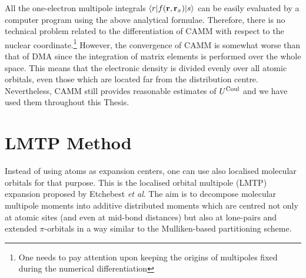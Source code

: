 \documentclass[a4paper,titlepage,twoside,fleqn,12pt]{book}
\begin{document}
\begin{appendices}
\begin{refsection}
All the one\hyp{}electron multipole integrals 
$\langle r \lvert f({\bf r},{\bf r}_x)\rvert s \rangle$ 
can be easily 
evaluated by a computer program using the above analytical formulae.
Therefore, there is no technical problem related to the differentiation of CAMM
with respect to the nuclear coordinate.\footnote{One needs to pay attention
upon keeping the origins of multipoles fixed during the numerical differentiation}
However, the convergence of CAMM
is somewhat worse than that of DMA since the integration of matrix elements 
is performed over the whole space. This means that the electronic density
is divided evenly over all atomic orbitals, even those which are located far
from the distribution centre. Nevertheless, CAMM still provides reasonable 
estimates of $U^{\rm Coul}$ and we have used them throughout this Thesis.

\section{LMTP Method}

Instead of using atoms as expansion centers, one can use also localised molecular orbitals
for that purpose. This is the localised orbital multipole (LMTP) expansion 
proposed by Etchebest \emph{et al}. \citep{Etchebest.Lavery.Pullman.TheorChimActa.1982}
The aim is to decompose molecular multipole moments into additive
distributed moments which are centred not only at atomic sites
(and even at mid\hyp{}bond distances) but also at lone\hyp{}pairs 
and extended $\pi$\hyp{}orbitals in a way similar to the Mulliken\hyp{}based
partitioning scheme.


\end{refsection}
\end{appendices}
\end{document}
